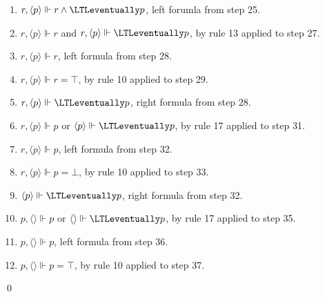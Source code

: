 \begin{myEx}
\begin{enumerate}
\item $r, \langle p \rangle \Vdash r \land \LTLeventually p$, left forumla from step 25.\\ %

\item $r, \langle p \rangle \Vdash r$ and $r, \langle p \rangle \Vdash \LTLeventually p$, by rule 13 applied to step 27.\\ %

\item $r, \langle p \rangle \Vdash r$, left formula from step 28.\\ %

\item $r, \langle p \rangle \Vdash r = \top$, by rule 10 applied to step 29.\\ %

\item $r, \langle p \rangle \Vdash \LTLeventually p$, right formula from step 28.\\ %

\item $r, \langle p \rangle \Vdash p$ or $\langle p \rangle \Vdash \LTLeventually p$, by rule 17 applied to step 31.\\ %

\item $r, \langle p \rangle \Vdash p$, left formula from step 32.\\ %

\item $r, \langle p \rangle \Vdash p = \bot$, by rule 10 applied to step 33.\\ %

\item $\langle p \rangle \Vdash \LTLeventually p$, right formula from step 32.\\ %

\item $p, \langle \rangle \Vdash p$ or $ \langle \rangle \Vdash \LTLeventually p$, by rule 17 applied to step 35.\\ %

\item $p, \langle \rangle \Vdash p$, left formula from step 36.\\ %

\item $p, \langle \rangle \Vdash p = \top$, by rule 10 applied to step 37.%
\end{enumerate}
\qed
\end{myEx}

